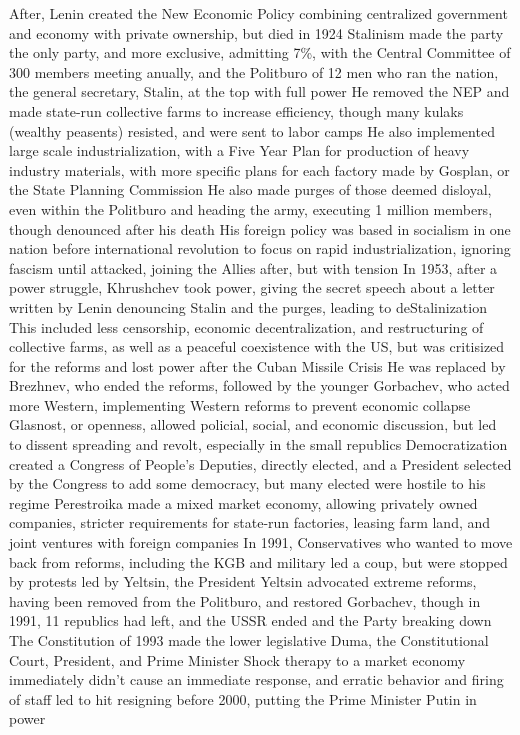 \documentclass[11 pt, twoside]{article}
\newenvironment{outline*}
{
	\begin{outline}[enumerate]
	}
	{\end{outline}
}
\begin{document}
\begin{outline*}
\3 After, Lenin created the New Economic Policy combining centralized government and economy with private ownership, but died in 1924
\2 Stalinism made the party the only party, and more exclusive, admitting 7\%, with the Central Committee of 300 members meeting anually, and the Politburo of 12 men who ran the nation, the general secretary, Stalin, at the top with full power
\3 He removed the NEP and made state-run collective farms to increase efficiency, though many kulaks (wealthy peasents) resisted, and were sent to labor camps
\3 He also implemented large scale industrialization, with a Five Year Plan for production of heavy industry materials, with more specific plans for each factory made by Gosplan, or the State Planning Commission
\3 He also made purges of those deemed disloyal, even within the Politburo and heading the army, executing 1 million members, though denounced after his death
\3 His foreign policy was based in socialism in one nation before international revolution to focus on rapid industrialization, ignoring fascism until attacked, joining the Allies after, but with tension
\1 In 1953, after a power struggle, Khrushchev took power, giving the secret speech about a letter written by Lenin denouncing Stalin and the purges, leading to deStalinization
\2 This included less censorship, economic decentralization, and restructuring of collective farms, as well as a peaceful coexistence with the US, but was critisized for the reforms and lost power after the Cuban Missile Crisis
\1 He was replaced by Brezhnev, who ended the reforms, followed by the younger Gorbachev, who acted more Western, implementing Western reforms to prevent economic collapse
\2 Glasnost, or openness, allowed policial, social, and economic discussion, but led to dissent spreading and revolt, especially in the small republics
\2 Democratization created a Congress of People's Deputies, directly elected, and a President selected by the Congress to add some democracy, but many elected were hostile to his regime
\2 Perestroika made a mixed market economy, allowing privately owned companies, stricter requirements for state-run factories, leasing farm land, and joint ventures with foreign companies
\1 In 1991, Conservatives who wanted to move back from reforms, including the KGB and military led a coup, but were stopped by protests led by Yeltsin, the President
\2 Yeltsin advocated extreme reforms, having been removed from the Politburo, and restored Gorbachev, though in 1991, 11 republics had left, and the USSR ended and the Party breaking down
\1 The Constitution of 1993 made the lower legislative Duma, the Constitutional Court, President, and Prime Minister
\2 Shock therapy to a market economy immediately didn't cause an immediate response, and erratic behavior and firing of staff led to hit resigning before 2000, putting the Prime Minister Putin in power
\end{outline*}
\end{document}
